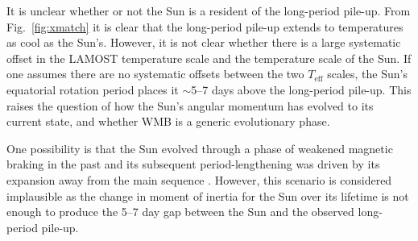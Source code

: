 \documentclass[linenumbers,tighten,trackchanges,twocolumn]{aastex631}
\newcommand{\lamostmcq}{LAMOST--McQuillan\xspace}
\newcommand{\teff}{\ensuremath{T_{\mathrm{eff}}}\xspace}
\newcommand{\msun}{$M_\odot$\xspace}
\newcommand{\prot}{\ensuremath{P_\mathrm{rot}}\xspace}
\begin{document}
{\color{red} 

It is unclear whether or not the Sun is a resident of the long-period pile-up. From Fig.~\ref{fig:xmatch} it is clear that the long-period pile-up extends to temperatures as cool as the Sun's. However, it is not clear whether there is a large systematic offset in the LAMOST temperature scale and the temperature scale of the Sun. If one assumes there are no systematic offsets between the two \teff scales, the Sun's equatorial rotation period places it $\sim$5--7 days above the long-period pile-up. This raises the question of how the Sun's angular momentum has evolved to its current state, and whether WMB is a generic evolutionary phase. 


One possibility is that the Sun evolved through a phase of weakened magnetic braking in the past and its subsequent period-lengthening was driven by its expansion away from the main sequence \citep[e.g.][]{vanSaders2019}. However, this scenario is considered implausible as the change in moment of inertia for the Sun over its lifetime is not enough to produce the 5--7 day gap between the Sun and the observed long-period pile-up. 




}
\end{document}
